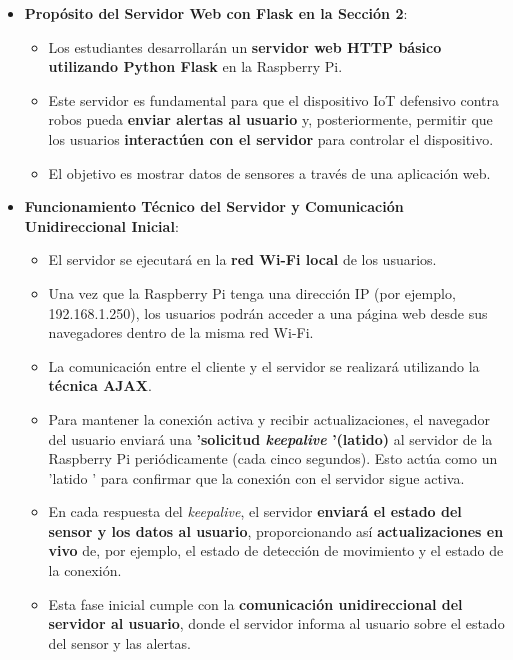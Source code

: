 \documentclass{report}
\begin{document}
\begin{itemize}
    \item \textbf{Propósito del Servidor Web con Flask en la Sección 2}:
    \begin{itemize}
        \item Los estudiantes desarrollarán un \textbf{servidor web HTTP básico utilizando Python Flask} en la Raspberry Pi.
        \item Este servidor es fundamental para que el dispositivo IoT defensivo contra robos pueda \textbf{enviar alertas al usuario} y, posteriormente, 
        permitir que los usuarios \textbf{interactúen con el servidor} para controlar el dispositivo.
        \item El objetivo es mostrar datos de sensores a través de una aplicación web.
    \end{itemize}

    \item \textbf{Funcionamiento Técnico del Servidor y Comunicación Unidireccional Inicial}:
    \begin{itemize}
        \item El servidor se ejecutará en la \textbf{red Wi-Fi local} de los usuarios.
        \item Una vez que la Raspberry Pi tenga una dirección IP (por ejemplo, 192.168.1.250), los usuarios podrán acceder a una página web desde sus 
        navegadores dentro de la misma red Wi-Fi.
        \item La comunicación entre el cliente y el servidor se realizará utilizando la \textbf{técnica AJAX}.
        \item Para mantener la conexión activa y recibir actualizaciones, el navegador del usuario enviará una \textbf{ 'solicitud \textit{keepalive} 
        '(latido)} al servidor de la Raspberry Pi periódicamente (cada cinco segundos). Esto actúa como un  'latido ' para confirmar que la conexión con 
        el servidor sigue activa.
        \item En cada respuesta del \textit{keepalive}, el servidor \textbf{enviará el estado del sensor y los datos al usuario}, proporcionando así 
        \textbf{actualizaciones en vivo} de, por ejemplo, el estado de detección de movimiento y el estado de la conexión.
        \item Esta fase inicial cumple con la \textbf{comunicación unidireccional del servidor al usuario}, donde el servidor informa al usuario sobre 
        el estado del sensor y las alertas.
    \end{itemize}


\end{itemize}
\end{document}
